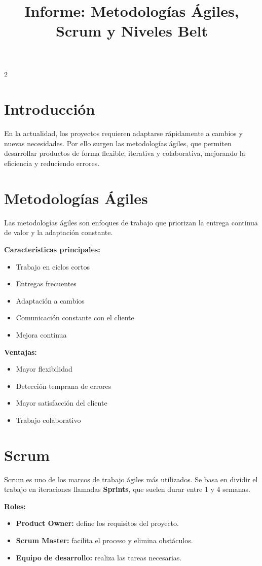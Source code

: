 \documentclass[11pt]{article}
\title{Informe: Metodologías Ágiles, Scrum y Niveles Belt}
\author{}
\date{}
\begin{document}
\maketitle

\begin{multicols}{2}

\section*{Introducción}
En la actualidad, los proyectos requieren adaptarse rápidamente a cambios y nuevas necesidades. 
Por ello surgen las metodologías ágiles, que permiten desarrollar productos de forma flexible, 
iterativa y colaborativa, mejorando la eficiencia y reduciendo errores.

\section*{Metodologías Ágiles}
Las metodologías ágiles son enfoques de trabajo que priorizan la entrega continua de valor 
y la adaptación constante.

\textbf{Características principales:}
\begin{itemize}
    \item Trabajo en ciclos cortos
    \item Entregas frecuentes
    \item Adaptación a cambios
    \item Comunicación constante con el cliente
    \item Mejora continua
\end{itemize}

\textbf{Ventajas:}
\begin{itemize}
    \item Mayor flexibilidad
    \item Detección temprana de errores
    \item Mayor satisfacción del cliente
    \item Trabajo colaborativo
\end{itemize}

\section*{Scrum}
Scrum es uno de los marcos de trabajo ágiles más utilizados. Se basa en dividir el trabajo 
en iteraciones llamadas \textbf{Sprints}, que suelen durar entre 1 y 4 semanas.

\textbf{Roles:}
\begin{itemize}
    \item \textbf{Product Owner:} define los requisitos del proyecto.
    \item \textbf{Scrum Master:} facilita el proceso y elimina obstáculos.
    \item \textbf{Equipo de desarrollo:} realiza las tareas necesarias.
\end{itemize}


\end{multicols}
\end{document}
